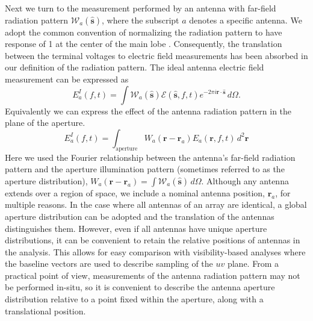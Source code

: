 \documentclass[a4paper,fleqn,usenatbib]{mnras}
\begin{document}
Next we turn to the measurement performed by an antenna with far-field radiation pattern 
$\mathcal{W}_a(\hat{\mathbf{s}})$, where the subscript $a$ denotes a specific antenna. We 
adopt the common convention of normalizing the radiation pattern to have response of 1 at the 
center of the main lobe \citep[e.g.][]{nap99}. Consequently, the translation between the terminal 
voltages to electric field measurements has been absorbed in our definition of the radiation 
pattern. The ideal antenna electric field measurement can be expressed as 
\begin{equation}
E^I_a(f,t) = \int \mathcal{W}_a(\hat{\mathbf{s}})\mathcal{E}(\hat{\mathbf{s}},f,t) e^{-2\pi i \mathbf{r} \cdot \hat{\mathbf{s}}}\, d\Omega. 
\end{equation}
Equivalently we can express the effect of the antenna radiation pattern in the plane of the 
aperture.
\begin{equation}
E^I_a(f,t) = \int_{\mathrm{aperture}}W_a(\mathbf{r}-\mathbf{r}_a)E_a(\mathbf{r},f,t)\,d^2\mathbf{r}
\end{equation}
Here we used the Fourier relationship between the antenna's far-field radiation pattern and the 
aperture illumination pattern (sometimes referred to as the aperture distribution), $W_a(\mathbf{r}-\mathbf{r}_a)=\int  \mathcal{W}_a(\hat{\mathbf{s}}) \, d
\Omega$. Although any antenna extends over a region of space, we include a nominal antenna 
position, $\mathbf{r}_a$, for multiple reasons. In the case where all antennas of an array are 
identical, a global aperture distribution can be adopted and the translation of the antennas 
distinguishes them. However, even if all antennas have unique aperture distributions, it can be 
convenient to retain the relative positions of antennas in the analysis. This allows for easy 
comparison with visibility-based analyses where the baseline vectors are used to describe 
sampling of the $uv$ plane. From a practical point of view, measurements of the antenna 
radiation pattern may not be performed in-situ, so it is convenient to describe the antenna 
aperture distribution relative to a point fixed within the aperture, along with a translational 
position.
\end{document}
